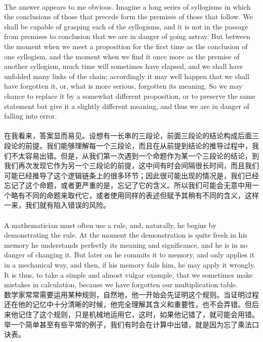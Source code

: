 \documentclass{article}
\begin{document}
\\
The answer appears to me obvious. Imagine a long series of syllogisms in which the conclusions of those that precede form the premises of those that follow. We shall be capable of grasping each of the syllogisms, and it is not in the passage from premises to conclusion that we are in danger of going astray. But between the moment when we meet a proposition for the first time as the conclusion of one syllogism, and the moment when we find it once more as the premise of another syllogism, much time will sometimes have elapsed, and we shall have unfolded many links of the chain; accordingly it may well happen that we shall have forgotten it, or, what is more serious, forgotten its meaning. So we may chance to replace it by a somewhat different proposition, or to preserve the same statement but give it a slightly different meaning, and thus we are in danger of falling into error.\\\\
在我看来，答案显而易见。设想有一长串的三段论，前面三段论的结论构成后面三段论的前提。我们能够理解每一个三段论，而且在从前提到结论的推导过程中，我们不太容易出错。但是，从我们第一次遇到一个命题作为某一个三段论的结论，到我们再次发现它作为另一个三段论的前提，这中间有时会间隔很长时间，而且我们可能已经推导了这个逻辑链条上的很多环节；因此很可能出现的情况是，我们已经忘记了这个命题，或者更严重的是，忘记了它的含义。所以我们可能会无意中用一个略有不同的命题来取代它，或者使用同样的表述但赋予其稍有不同的含义，这样一来，我们就有陷入错误的风险。\\ 

\\
A mathematician must often use a rule, and, naturally, he begins by demonstrating the rule. At the moment the demonstration is quite fresh in his memory he understands perfectly its meaning and significance, and he is in no danger of changing it. But later on he commits it to memory, and only applies it in a mechanical way, and then, if his memory fails him, he may apply it wrongly. It is thus, to take a simple and almost vulgar example, that we sometimes make mistakes in calculation, because we have forgotten our multiplication table.\\
数学家常常需要运用某种规则，自然地，他一开始会先证明这个规则。当证明过程还在他的记忆中十分清晰的时候，他完全理解其含义和重要性，也不会弄错。但后来他记住了这个规则，只是机械地运用它，这时，如果他记错了，就可能会用错。举一个简单甚至有些平常的例子，我们有时会在计算中出错，就是因为忘了乘法口诀表。 \\
\end{document}
